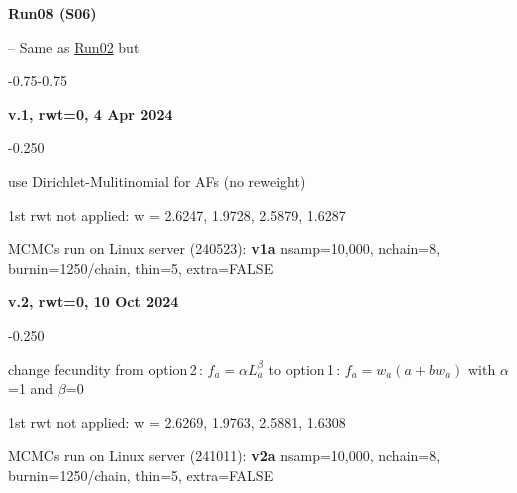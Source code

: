 \hypertarget{R08}{\textbf{Run08 (S06)}} -- Same as \hyperlink{R02}{Run02} but
\begin{itemize_csas}{-0.75}{-0.75}
	\item \textbf{v.1, rwt=0, 4 Apr 2024}
	\begin{itemize_csas}{-0.25}{0}
		\item use Dirichlet-Mulitinomial for AFs (no reweight)
		\item 1st rwt not applied: w = 2.6247, 1.9728, 2.5879, 1.6287 
		\item MCMCs run on Linux server (240523): \textbf{v1a} nsamp=10,000, nchain=8, burnin=1250/chain, thin=5, extra=FALSE
	\end{itemize_csas}
	\item \textbf{v.2, rwt=0, 10 Oct 2024}
	\begin{itemize_csas}{-0.25}{0}
		\item change fecundity from option\,2\,: $f_a = \alpha L_a^{\beta}$ to option\,1\,:  $f_a = w_a (a + b w_a)$ with $\alpha$=1 and $\beta$=0
		\item 1st rwt not applied: w = 2.6269, 1.9763, 2.5881, 1.6308
		\item MCMCs run on Linux server (241011): \textbf{v2a} nsamp=10,000, nchain=8, burnin=1250/chain, thin=5, extra=FALSE
	\end{itemize_csas}
\end{itemize_csas}

